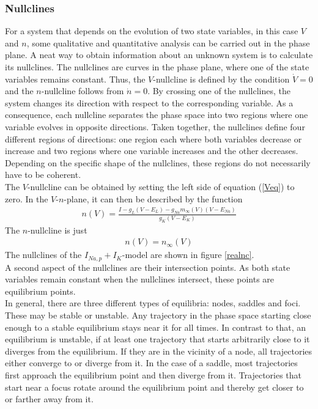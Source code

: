 \documentclass[12pt,a4paper]{article}
\begin{document}
\subsubsection{Nullclines}
For a system that depends on the evolution of two state variables, in this case $V$ and $n$, some qualitative and quantitative analysis can be carried out in the phase plane. A neat way to obtain information about an unknown system is to calculate its nullclines. The nullclines are curves in the phase plane, where one of the state variables remains constant. Thus, the $V$-nullcline is defined by the condition $\dot{V}=0$ and the $n$-nullcline follows from $\dot{n}=0$. By crossing one of the nullclines, the system changes its direction with respect to the corresponding variable. As a consequence, each nullcline separates the phase space into two regions where one variable evolves in opposite directions. Taken together, the nullclines define four different regions of directions: one region each where both variables decrease or increase and two regions where one variable increases and the other decreases. Depending on the specific shape of the nullclines, these regions do not necessarily have to be coherent.\\
The $V$-nullcline can be obtained by setting the left side of equation (\ref{Veq}) to zero. In the $V$-$n$-plane, it can then be described by the function
\begin{align}
n(V)=\frac{I - g_L(V-E_L) - g_{Na}m_{\infty}(V)(V-E_{Na})}{g_K(V-E_K)}
\end{align} 
The $n$-nullcline is just
\begin{align}
n(V)=n_\infty(V)
\end{align}
The nullclines of the $I_{Na,p}+I_K$-model are shown in figure \ref{realnc}.\\
A second aspect of the nullclines are their intersection points. As both state variables remain constant when the nullclines intersect, these points are equilibrium points.\\
In general, there are three different types of equilibria: nodes, saddles and foci. These may be stable or unstable. Any trajectory in the phase space starting close enough to a stable equilibrium stays near it for all times. In contrast to that, an equilibrium is unstable, if at least one trajectory that starts arbitrarily close to it diverges from the equilibrium.
If they are in the vicinity of a node, all trajectories either converge to or diverge from it. In the case of a saddle, most trajectories first approach the equilibrium point and then diverge from it. Trajectories that start near a focus rotate around the equilibrium point and thereby get closer to or farther away from it. 
\end{document}
